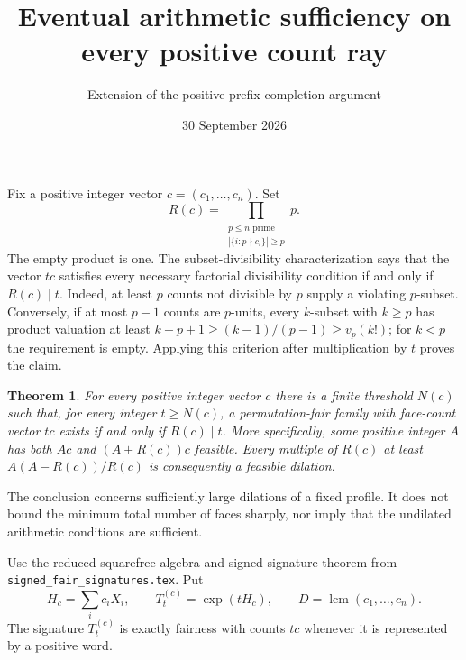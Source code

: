 \documentclass[11pt]{article}
\title{Eventual arithmetic sufficiency on every positive count ray}
\author{Extension of the positive-prefix completion argument}
\date{30 September 2026}
\newtheorem{theorem}{Theorem}
\begin{document}
\maketitle

Fix a positive integer vector $c=(c_1,\ldots,c_n)$. Set
\[
 R(c)=\prod_{\substack{p\le n\text{ prime}\\
              |\{i:p\nmid c_i\}|\ge p}}p.
\]
The empty product is one. The subset-divisibility characterization says
that the vector $tc$ satisfies every necessary factorial divisibility
condition if and only if $R(c)\mid t$.
Indeed, at least $p$ counts not divisible by $p$ supply a violating
$p$-subset. Conversely, if at most $p-1$ counts are $p$-units, every
$k$-subset with $k\ge p$ has product valuation at least
$k-p+1\ge(k-1)/(p-1)\ge v_p(k!)$; for $k<p$ the requirement is empty.
Applying this criterion after multiplication by $t$ proves the claim.

\begin{theorem}\label{main}
For every positive integer vector $c$ there is a finite threshold
$N(c)$ such that, for every integer $t\ge N(c)$, a permutation-fair
family with face-count vector $tc$ exists if and only if $R(c)\mid t$.
More specifically, some positive integer $A$ has both $Ac$ and
$(A+R(c))c$ feasible. Every multiple of $R(c)$ at least
$A(A-R(c))/R(c)$ is consequently a feasible dilation.
\end{theorem}

The conclusion concerns sufficiently large dilations of a fixed profile.
It does not bound the minimum total number of faces sharply, nor imply
that the undilated arithmetic conditions are sufficient.

Use the reduced squarefree algebra and signed-signature theorem from
\texttt{signed\_fair\_signatures.tex}. Put
\[
 H_c=\sum_i c_iX_i,\qquad T_t^{(c)}=\exp(tH_c),\qquad
 D=\operatorname{lcm}(c_1,\ldots,c_n).
\]
The signature $T_t^{(c)}$ is exactly fairness with counts $tc$ whenever
it is represented by a positive word.
\end{document}
